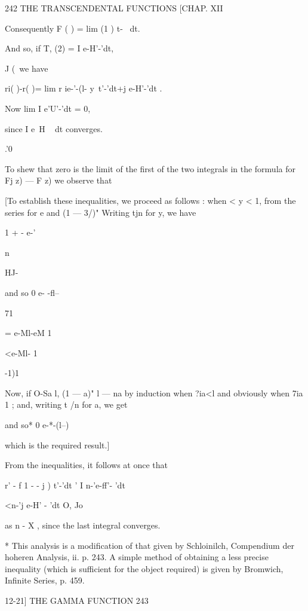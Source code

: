 242 THE TRANSCENDENTAL FUNCTIONS [CHAP. XII 

Consequently F ( ) = lim (1 ) t-~ dt. 

And so, if T, (2) = I e-H'-'dt, 

J (\ 
we have 

ri( )-r( )= lim r ie-'-(l- y\ t'-'dt+j e-H'-'dt . 

Now lim I e'U'-'dt = 0, 

since I e~H ~ dt converges. 

.'0 

To shew that zero is the limit of the first of the two integrals in the 
formula for Fj  z) — F  z) we observe that 

[To establish these inequalities, we proceed as follows : when < y < 1, 
from the series for e  and (1 — 3/)"  Writing tjn for y, we have 



1 + -  e-'  

n   



HJ- 



and so 0 e- -fl-- 

71 



= e-Ml-eM 1 



<e-Ml- 1 



-1)1 



Now, if O-Sa l, (1 — a)" l — na by induction when ?ia<l and obviously when 
7ia   1 ; and, writing t /n  for a, we get 

and so* 0 e-*-(l--) %

which is the required result.] 

From the inequalities, it follows at once that 

r' - f 1 - - j )  t'-'dt '   I n-'e-ff'- 'dt 

<n-'j e-H' - 'dt O, 
Jo 

as n -  X , since the last integral converges. 

* This analysis is a modification of that given by Schloinilch, Compendium der hoheren 
Analysis, ii. p. 243. A simple method of obtaining a less precise inequality (which is sufficient 
for the object required) is given by Bromwich, Infinite Series, p. 459. 



12-21] THE GAMMA FUNCTION 243 

